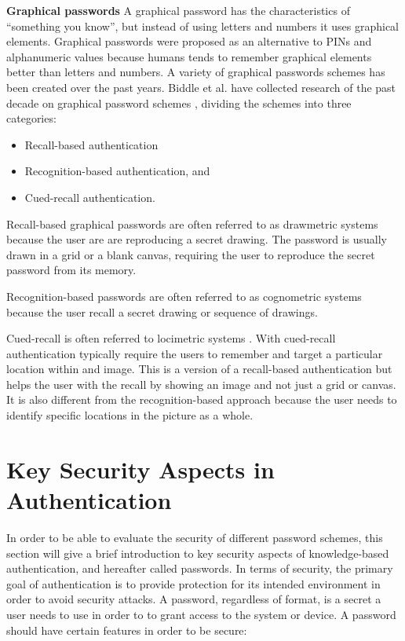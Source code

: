       {\bf Graphical passwords}
      A graphical password has the characteristics of ``something you know'', but instead of using letters and numbers it uses graphical elements. Graphical passwords were proposed as an alternative to PINs and alphanumeric values because humans tends to remember graphical elements better than letters and numbers. A variety of graphical passwords schemes has been created over the past years. Biddle et al. have collected research of the past decade on graphical password schemes \cite{Biddle}, dividing the schemes into three categories:

      \begin{itemize}
        \item Recall-based authentication
        \item Recognition-based authentication, and 
        \item Cued-recall authentication.
      \end{itemize}

    Recall-based graphical passwords are often referred to as drawmetric systems \cite{DeAngeli} because the user are are reproducing a secret drawing. The password is usually drawn in a grid or a blank canvas, requiring the user to reproduce the secret password from its memory.

    Recognition-based passwords are often referred to as cognometric systems \cite{DeAngeli} because the user recall a secret drawing or sequence of drawings.

    Cued-recall is often referred to locimetric systems \cite{DeAngeli}. With cued-recall authentication typically require the users to remember and target a particular location within and image. This is a version of a recall-based authentication but helps the user with the recall by showing an image and not just a grid or canvas. It is also different from the recognition-based approach because the user needs to identify specific locations in the picture as a whole. 

  \section{Key Security Aspects in Authentication} \label{sec:entropy}
  In order to be able to evaluate the security of different password schemes, this section will give a brief introduction to key security aspects of knowledge-based authentication, and hereafter called passwords. In terms of security, the primary goal of authentication is to provide protection for its intended environment in order to avoid security attacks. A password, regardless of format, is a secret a user needs to use in order to to grant access to the system or device. A password should have certain features in order to be secure:

